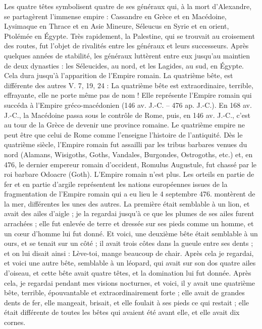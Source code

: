 \begin{multicols}{2}
{Les quatre têtes symbolisent quatre de ses généraux qui, à la mort d’Alexandre, se partagèrent l’immense empire : Cassandre en Grèce et en Macédoine, Lysimaque en Thrace et en Asie Mineure, Séleucus en Syrie et en orient, Ptolémée en Égypte.
Très rapidement, la Palestine, qui se trouvait au croisement des routes, fut l’objet de rivalités entre les généraux et leurs successeurs. Après quelques années de stabilité, les généraux luttèrent entre eux jusqu’au maintien de deux dynasties : les Séleucides, au nord, et les Lagides, au sud, en Égypte. Cela dura jusqu'à l’apparition de l’Empire romain.
La quatrième bête, est différente des autres
V. 7, 19, 24 : La quatrième bête est extraordinaire, terrible, effrayante, elle ne porte même pas de nom ! Elle représente l’Empire romain qui succéda à l’Empire gréco-macédonien (146 av. J.-C. – 476 ap. J.-C.). En 168 av. J.-C., la Macédoine passa sous le contrôle de Rome, puis, en 146 av. J.-C., c'est au tour de la Grèce de devenir une  province romaine.
 Le quatrième empire ne peut être que celui de Rome comme l'enseigne l'histoire de l'antiquité. 
Dès le quatrième siècle, l'Empire romain fut assailli par les tribus barbares venues du nord (Alamans, Wisigoths, Goths, Vandales, Burgondes, Ostrogoths, etc.) et, en 476, le dernier empereur romain d'occident, Romulus Augustule, fut chassé par le roi barbare Odoacre (Goth). L'Empire romain n'est plus.
Les orteils en partie de fer et en partie d'argile représentent les nations européennes issues de la fragmentation de l'Empire romain qui a eu lieu le 4 septembre 476.} montèrent de la mer, différentes les unes des autres.
La première était semblable à un lion, et avait des ailes d'aigle ; je la regardai jusqu'à ce que les plumes de ses ailes furent arrachées ; elle fut enlevée de terre et dressée sur ses pieds comme un homme, et un cœur d'homme lui fut donné.
Et voici, une deuxième bête  était semblable à un ours, et se tenait sur un côté ;  il avait trois côtes dans la gueule entre ses dents ; et on lui disait ainsi : Lève-toi, mange beaucoup de chair.
Après cela je regardai, et voici une autre bête, semblable à un léopard, qui avait sur son dos quatre ailes d'oiseau, et cette bête avait quatre têtes, et la domination lui fut donnée.
Après cela, je regardai pendant mes visions nocturnes, et voici, il y avait une quatrième bête, terrible, épouvantable et extraordinairement forte ; elle avait de grandes dents de fer, elle mangeait, brisait, et elle foulait à ses pieds ce qui restait ;  elle était différente de toutes les bêtes qui avaient été avant elle, et elle avait dix cornes.

\end{multicols}
